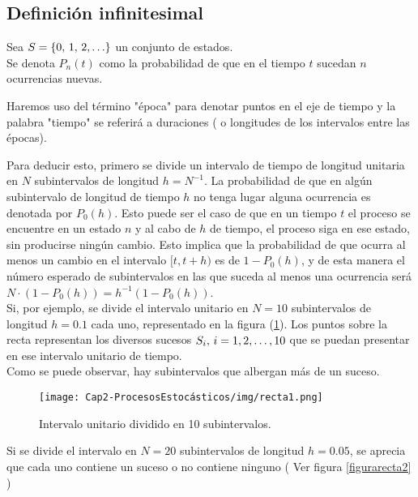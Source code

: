 \subsection{Definición infinitesimal}
    Sea $S=\{0,\thinspace 1,\thinspace 2,\ldots\}$ un conjunto de estados.\\Se denota $P_n(t)$ como la probabilidad de que en el tiempo $t$ sucedan $n$ ocurrencias nuevas.\\
    \begin{Obs}
    Haremos uso del término "época" para denotar puntos en el eje de tiempo y la palabra "tiempo" se referirá a duraciones ( o longitudes de los intervalos entre las épocas).
    \end{Obs}
    Para deducir esto, primero se divide un intervalo de tiempo de longitud unitaria en $N$ subintervalos de longitud $h=N^{-1}$.
    La probabilidad de que en algún subintervalo de longitud de tiempo $h$ no tenga lugar alguna ocurrencia es denotada por $P_0(h)$. 
    Esto puede ser el caso de que en un tiempo $t$ el proceso se encuentre en un estado $n$ y al cabo de $h$ de tiempo, el proceso siga en ese estado, sin producirse ningún cambio. Esto implica que la probabilidad de que ocurra al menos un cambio en el intervalo $[t,t+h)$ es de  $1-P_0(h)$, y de esta manera el número esperado de subintervalos en las que suceda al menos una ocurrencia será $N\cdot(1-P_0(h))=h^{-1}(1-P_0(h))$.
    \\Si, por ejemplo, se divide el intervalo unitario en $N=10$ subintervalos de longitud $h=0.1$ cada uno, representado en la figura (\ref{fig-procesoPoison-recta1}). Los puntos sobre la recta representan los diversos sucesos $S_i,\thinspace i=1,2,\ldots,10$ que se puedan presentar en ese intervalo unitario de tiempo.\\ Como se puede observar, hay subintervalos que albergan más de un suceso.
    \begin{center}
        \begin{figure}[htb]
            \texttt{[image: Cap2-ProcesosEstocásticos/img/recta1.png]}
            \caption{Intervalo unitario dividido en 10 subintervalos.}
            \label{fig-procesoPoison-recta1}
            \vspace*{0.05in}
        \end{figure}
    \end{center}
    Si se divide el intervalo en $N=20$ subintervalos de longitud $h=0.05$, se aprecia que cada uno contiene un suceso o no contiene ninguno ( Ver figura \ref{figurarecta2} )\\  
